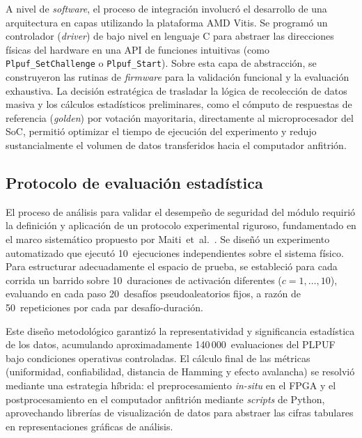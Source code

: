 A nivel de \textit{software}, el proceso de integración involucró el desarrollo de
una arquitectura en capas utilizando la plataforma AMD Vitis. Se programó un
controlador (\textit{driver}) de bajo nivel en lenguaje C para abstraer las
direcciones físicas del hardware en una API de funciones intuitivas (como
\texttt{Plpuf\_SetChallenge} o \texttt{Plpuf\_Start}). Sobre esta capa de
abstracción, se construyeron las rutinas de \textit{firmware} para la validación
funcional y la evaluación exhaustiva. La decisión estratégica de trasladar la
lógica de recolección de datos masiva y los cálculos estadísticos preliminares, como el cómputo de respuestas de referencia (\textit{golden}) por votación
mayoritaria, directamente al microprocesador del SoC, permitió optimizar el
tiempo de ejecución del experimento y redujo sustancialmente el volumen de datos
transferidos hacia el computador anfitrión.

\subsection{Protocolo de evaluación estadística}
\label{sec:proc_eval}

El proceso de análisis para validar el desempeño de seguridad del módulo requirió
la definición y aplicación de un protocolo experimental riguroso, fundamentado en
el marco sistemático propuesto por Maiti~et~al.~\cite{maiti_2012_systematic}.
Se diseñó un experimento automatizado que ejecutó 10~ejecuciones independientes
sobre el sistema físico. Para estructurar adecuadamente el espacio de prueba,
se estableció para cada corrida un barrido sobre 10~duraciones de activación
diferentes ($c = 1, \ldots, 10$), evaluando en cada paso 20~desafíos
pseudoaleatorios fijos, a razón de 50~repeticiones por cada par
desafío-duración.

Este diseño metodológico garantizó la representatividad y significancia
estadística de los datos, acumulando aproximadamente 140\,000~evaluaciones del
PLPUF bajo condiciones operativas controladas. El cálculo final de las métricas
(uniformidad, confiabilidad, distancia de Hamming y efecto avalancha) se resolvió
mediante una estrategia híbrida: el preprocesamiento \textit{in-situ} en el FPGA
y el postprocesamiento en el computador anfitrión mediante \textit{scripts} de
Python, aprovechando librerías de visualización de datos para abstraer las
cifras tabulares en representaciones gráficas de análisis.


